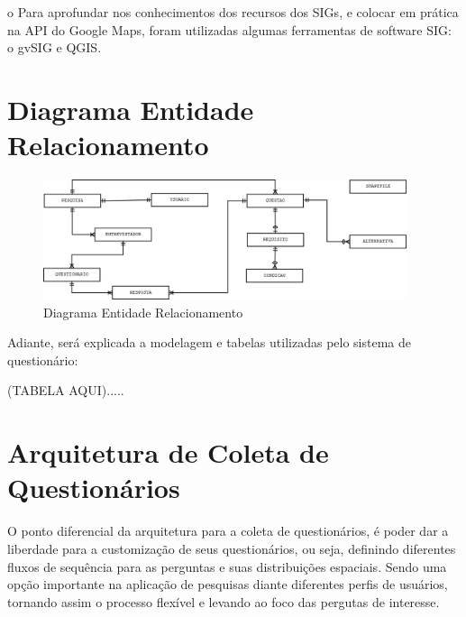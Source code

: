 \documentclass[
	12pt,				%
    oneside,			%
	a4paper,			%
	english,			%
	french,				%
	spanish,			%
	brazil,				%
	]{abntex2}
\begin{document}
o	Para aprofundar nos conhecimentos dos recursos dos SIGs, e colocar em prática na API do Google Maps, foram utilizadas algumas ferramentas de software SIG: o gvSIG e QGIS.


\section{Diagrama Entidade Relacionamento}


\begin{figure} [hbt] 
\label{figura1} 
\caption{Diagrama Entidade Relacionamento}
\includegraphics[width=0.95\textwidth]{diagrama.png} %
\end{figure}

Adiante, será explicada a modelagem e tabelas utilizadas pelo sistema de questionário:

(TABELA AQUI).....

\section{Arquitetura de Coleta de Questionários}



O ponto diferencial da arquitetura para a coleta de questionários, é poder dar a liberdade para a customização de seus questionários, ou seja, definindo diferentes fluxos de sequência para as perguntas e suas distribuições espaciais. Sendo uma opção importante na aplicação de pesquisas diante diferentes perfis de usuários, tornando assim o processo flexível e levando ao foco das pergutas de interesse.
\end{document}
